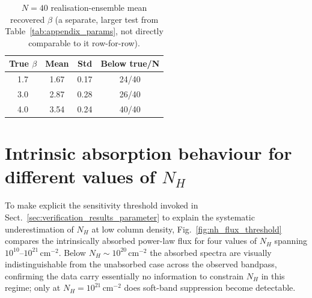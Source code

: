 \documentclass{aa}
\begin{document}
            \begin{table}[h]
                \caption{$N=40$ realisation-ensemble mean recovered $\beta$ (a separate, larger test from Table~\ref{tab:appendix_params}, not directly comparable to it row-for-row).}
                \centering
                \begin{tabular}{cccc}
                \hline\hline
                True $\beta$ & Mean & Std & Below true/N \\
                \hline
                1.7 & 1.67 & 0.17 & 24/40 \\
                3.0 & 2.87 & 0.28 & 26/40 \\
                4.0 & 3.54 & 0.24 & 40/40 \\
                \hline
                \end{tabular}
                \label{tab:beta_N40_ensemble}
            \end{table}


\section{Intrinsic absorption behaviour for different values of $N_H$}
\label{app:optical_depth}

To make explicit the sensitivity threshold invoked in Sect.~\ref{sec:verification_results_parameter} to explain the systematic underestimation of $N_H$ at low column density, Fig.~\ref{fig:nh_flux_threshold} compares the intrinsically absorbed power-law flux for four values of $N_H$ spanning $10^{10}$--$10^{21}$\,cm$^{-2}$. Below $N_H \sim 10^{20}$\,cm$^{-2}$ the absorbed spectra are visually indistinguishable from the unabsorbed case across the observed bandpass, confirming the data carry essentially no information to constrain $N_H$ in this regime; only at $N_H = 10^{21}$\,cm$^{-2}$ does soft-band suppression become detectable.
\end{document}
